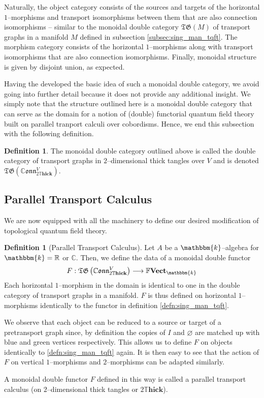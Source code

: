\documentclass{amsart}
\newcommand{\R}{\mathbb{R}}
\newcommand{\C}{\mathbb{C}}
\newcommand{\K}{\mathbbm{k}}
\renewcommand{\to}[1][]{\stackrel{#1}{\longrightarrow}}
\newcommand{\br}[1]{\left( #1 \right)}
\newcommand{\FFVect}{\mathbb{F}\textbf{Vect}}
\newcommand{\DThick}{2\mathbb{T}\mathbf{hick}}
\newcommand{\TG}{\mathfrak{TG}}
\newcommand{\CConn}{\mathbb{C}\mathfrak{onn}}
\numberwithin{thm}{section}
\theoremstyle{definition}
\newtheorem{defn}[thm]{Definition}
\begin{document}
Naturally, the object category consists of the sources and targets of the
horizontal $1$--morphisms and transport isomorphisms between them that are also
connection isomorphisms -- similar to the monoidal double category $\TG(M)$ of
transport graphs in a manifold $M$ defined in subsection
\ref{subsec:sing_man_tqft}. The morphism category consists of the horizontal
$1$--morphisms along with transport isomorphisms that are also connection
isomorphisms. Finally, monoidal structure is given by disjoint union, as
expected.

Having the developed the basic idea of such a monoidal double category, we avoid
going into further detail because it does not provide any additional insight. We
simply note that the structure outlined here is a monoidal double category that
can serve as the domain for a notion of (double) functorial quantum field
theory built on parallel tranport calculi over cobordisms.
Hence, we end this subsection with the following definition.

\begin{defn}
The monoidal double category outlined above is called the double category of
transport graphs in $2$--dimensional thick tangles over $V$ and is
denoted $\TG\br{\CConn^V_{\DThick}}$.
\end{defn}


%

\subsection{Parallel Transport Calculus}

We are now equipped with all the machinery to define our desired modification
of topological quantum field theory.

\begin{defn}[Parallel Transport Calculus]
Let $A$ be a $\K$--algebra for $\K = \R$ or $\C$. Then, we define the data of a
monoidal double functor
\[
  F : \TG\br{\CConn^V_{\DThick}} \to \FFVect_{\K}
\]
Each horizontal $1$--morphism in the domain is identical to one in the
double category of transport graphs in a manifold. $F$ is thus defined on
horizontal $1$--morphisms identically to the functor in definition
\ref{defn:sing_man_tqft}.

We observe that each object can be reduced to a source or target of a
pretransport graph since, by definition the copies of $I$ and $\varnothing$ are
matched up with blue and green vertices respectively. This allows us to define
$F$ on objects identically to \ref{defn:sing_man_tqft} again. It is then easy to
see that the action of $F$ on vertical $1$--morphisms and $2$--morphisms can be
adapted similarly.

A monoidal double functor $F$ defined in this way is called a parallel transport
calculus (on $2$--dimensional thick tangles or $\DThick$).
\end{defn}
\end{document}
